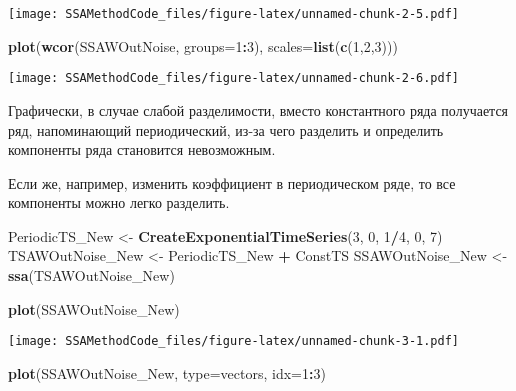 \documentclass[
]{article}
\newenvironment{Shaded}{\begin{snugshade}}{\end{snugshade}}
\newcommand{\AttributeTok}[1]{\textcolor[rgb]{0.13,0.29,0.53}{#1}}
\newcommand{\DecValTok}[1]{\textcolor[rgb]{0.00,0.00,0.81}{#1}}
\newcommand{\FunctionTok}[1]{\textcolor[rgb]{0.13,0.29,0.53}{\textbf{#1}}}
\newcommand{\NormalTok}[1]{#1}
\newcommand{\OtherTok}[1]{\textcolor[rgb]{0.56,0.35,0.01}{#1}}
\newcommand{\SpecialCharTok}[1]{\textcolor[rgb]{0.81,0.36,0.00}{\textbf{#1}}}
\newcommand{\StringTok}[1]{\textcolor[rgb]{0.31,0.60,0.02}{#1}}
\begin{document}
\texttt{[image: SSAMethodCode\_files/figure-latex/unnamed-chunk-2-5.pdf]}

\begin{Shaded}
\begin{Highlighting}[]
\FunctionTok{plot}\NormalTok{(}\FunctionTok{wcor}\NormalTok{(SSAWOutNoise, }\AttributeTok{groups=}\DecValTok{1}\SpecialCharTok{:}\DecValTok{3}\NormalTok{), }\AttributeTok{scales=}\FunctionTok{list}\NormalTok{(}\FunctionTok{c}\NormalTok{(}\DecValTok{1}\NormalTok{,}\DecValTok{2}\NormalTok{,}\DecValTok{3}\NormalTok{)))}
\end{Highlighting}
\end{Shaded}

\texttt{[image: SSAMethodCode\_files/figure-latex/unnamed-chunk-2-6.pdf]}

Графически, в случае слабой разделимости, вместо константного ряда
получается ряд, напоминающий периодический, из-за чего разделить и
определить компоненты ряда становится невозможным.

Если же, например, изменить коэффициент в периодическом ряде, то все
компоненты можно легко разделить.

\begin{Shaded}
\begin{Highlighting}[]
\NormalTok{PeriodicTS\_New }\OtherTok{\textless{}{-}} \FunctionTok{CreateExponentialTimeSeries}\NormalTok{(}\DecValTok{3}\NormalTok{, }\DecValTok{0}\NormalTok{, }\DecValTok{1}\SpecialCharTok{/}\DecValTok{4}\NormalTok{, }\DecValTok{0}\NormalTok{, }\DecValTok{7}\NormalTok{)}
\NormalTok{TSAWOutNoise\_New }\OtherTok{\textless{}{-}}\NormalTok{ PeriodicTS\_New }\SpecialCharTok{+}\NormalTok{ ConstTS}
\NormalTok{SSAWOutNoise\_New }\OtherTok{\textless{}{-}} \FunctionTok{ssa}\NormalTok{(TSAWOutNoise\_New)}

\FunctionTok{plot}\NormalTok{(SSAWOutNoise\_New)}
\end{Highlighting}
\end{Shaded}

\texttt{[image: SSAMethodCode\_files/figure-latex/unnamed-chunk-3-1.pdf]}

\begin{Shaded}
\begin{Highlighting}[]
\FunctionTok{plot}\NormalTok{(SSAWOutNoise\_New, }\AttributeTok{type=}\StringTok{\textquotesingle{}vectors\textquotesingle{}}\NormalTok{, }\AttributeTok{idx=}\DecValTok{1}\SpecialCharTok{:}\DecValTok{3}\NormalTok{)}
\end{Highlighting}
\end{Shaded}
\end{document}
